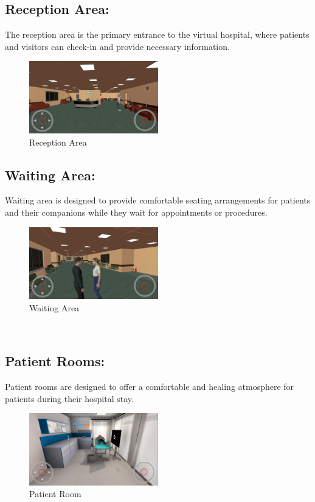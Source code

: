 \subsection{Reception Area:}
The reception area is the primary entrance to the virtual hospital, where patients and visitors can check-in and provide necessary information.
\begin{figure}[h]
	\centering
	\includegraphics[width=0.5\textwidth, height=0.3\textheight]{Images/Reception Area.png}
	\caption{Reception Area}
	\label{fig:system-diagram}
\end{figure}
\newline

\subsection{Waiting Area:}	
Waiting area is designed to provide comfortable seating arrangements for patients and their companions while they wait for appointments or procedures.
\begin{figure}[h]
		\centering
		\includegraphics[width=0.5\textwidth, height=0.3\textheight]{Images/Waiting Area.png}
		\caption{Waiting Area}
\end{figure}
\\
\subsection{Patient Rooms:}	
Patient rooms are designed to offer a comfortable and healing atmosphere for patients during their hospital stay.
	\begin{figure}[h]
		\centering
		\includegraphics[width=0.5\textwidth, height=0.3\textheight]{Images/Patient Room.png}
		\caption{Patient Room}
		\label{fig:Patient-Room}
	\end{figure}	

